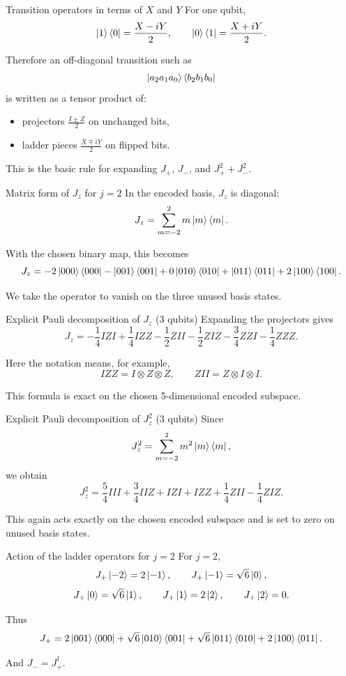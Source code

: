\documentclass[aspectratio=169]{beamer}
\begin{document}
\begin{frame}{Transition operators in terms of \(X\) and \(Y\)}
For one qubit,
\[
\ket{1}\bra{0} = \frac{X-iY}{2},
\qquad
\ket{0}\bra{1} = \frac{X+iY}{2}.
\]

Therefore an off-diagonal transition such as
\[
\ket{a_2a_1a_0}\bra{b_2b_1b_0}
\]
is written as a tensor product of:
\begin{itemize}
\item projectors \(\frac{I\pm Z}{2}\) on unchanged bits,
\item ladder pieces \(\frac{X\mp iY}{2}\) on flipped bits.
\end{itemize}

This is the basic rule for expanding \(J_+\), \(J_-\), and \(J_+^2+J_-^2\).
\end{frame}

\begin{frame}{Matrix form of \(J_z\) for \(j=2\)}
In the encoded basis, \(J_z\) is diagonal:
\[
J_z
=
\sum_{m=-2}^{2} m \ket{m}\bra{m}.
\]

With the chosen binary map, this becomes
\[
J_z
=
-2\ket{000}\bra{000}
-\ket{001}\bra{001}
+0\ket{010}\bra{010}
+\ket{011}\bra{011}
+2\ket{100}\bra{100}.
\]

We take the operator to vanish on the three unused basis states.
\end{frame}

\begin{frame}{Explicit Pauli decomposition of \(J_z\) (3 qubits)}
Expanding the projectors gives
\[
J_z
=
-\frac{1}{4} IZI
+\frac{1}{4} IZZ
-\frac{1}{2} ZII
-\frac{1}{2} ZIZ
-\frac{3}{4} ZZI
-\frac{1}{4} ZZZ.
\]

Here the notation means, for example,
\[
IZZ = I\otimes Z\otimes Z,
\qquad
ZII = Z\otimes I\otimes I.
\]

This formula is exact on the chosen 5-dimensional encoded subspace.
\end{frame}

\begin{frame}{Explicit Pauli decomposition of \(J_z^2\) (3 qubits)}
Since
\[
J_z^2 = \sum_{m=-2}^{2} m^2 \ket{m}\bra{m},
\]
we obtain
\[
J_z^2
=
\frac{5}{4} III
+\frac{3}{4} IIZ
+IZI
+IZZ
+\frac{1}{4} ZII
-\frac{1}{4} ZIZ.
\]

This again acts exactly on the chosen encoded subspace and is set to zero on unused basis states.
\end{frame}

\begin{frame}{Action of the ladder operators for \(j=2\)}
For \(j=2\),
\[
J_+\ket{-2}=2\ket{-1},
\qquad
J_+\ket{-1}=\sqrt{6}\ket{0},
\]
\[
J_+\ket{0}=\sqrt{6}\ket{1},
\qquad
J_+\ket{1}=2\ket{2},
\qquad
J_+\ket{2}=0.
\]

Thus
\[
J_+
=
2\ket{001}\bra{000}
+\sqrt{6}\ket{010}\bra{001}
+\sqrt{6}\ket{011}\bra{010}
+2\ket{100}\bra{011}.
\]

And \(J_- = J_+^\dagger\).
\end{frame}
\end{document}
